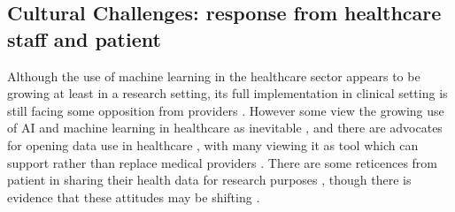 \subsection{Cultural Challenges: response from healthcare staff and patient}
Although the use of machine learning in the healthcare sector appears to be growing at least in a research setting, its full implementation in clinical setting is still facing some opposition from providers \citep{Cabitza:2017hv}. However some view the growing use of AI and machine learning in healthcare as inevitable \citep{Murdoch:2013hm}, and there are advocates for opening data use in healthcare \citep{Kostkova:2016ur}, with many viewing it as tool which can support rather than replace medical providers \citep{Pesapane:2018kv}.
There are some reticences from patient in sharing their health data for research purposes \citep{Goldacre:tf}, though there is evidence that these attitudes may be shifting \citep{Kostkova:2016ur}. 

